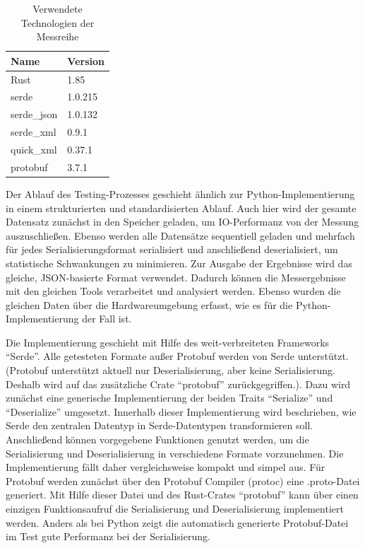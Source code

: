 \documentclass[ngerman]{seminarvorlage}
\begin{document}
\begin{table}[H]
    \centering
    \begin{tabular}{|l|l|}
    \hline
    \textbf{Name} & \textbf{Version} \\ \hline
    Rust          & 1.85             \\ \hline
    serde         & 1.0.215          \\ \hline
    serde\_json   & 1.0.132          \\ \hline
    serde\_xml    & 0.9.1            \\ \hline
    quick\_xml    & 0.37.1           \\ \hline
    protobuf      & 3.7.1            \\ \hline
    \end{tabular}
    \caption{Verwendete Technologien der Messreihe}
\end{table}

Der Ablauf des Testing-Prozesses geschieht ähnlich zur Python-Implementierung in einem strukturierten und standardisierten Ablauf. Auch hier wird der gesamte Datensatz zunächst in den Speicher geladen, um IO-Performanz von der Messung auszuschließen. Ebenso werden alle Datensätze sequentiell geladen und mehrfach für jedes Serialisierungsformat serialisiert und anschließend deserialisiert, um statistische Schwankungen zu minimieren. Zur Ausgabe der Ergebnisse wird das gleiche, JSON-basierte Format verwendet. Dadurch können die Messergebnisse mit den gleichen Tools verarbeitet und analysiert werden. Ebenso wurden die gleichen Daten über die Hardwareumgebung erfasst, wie es für die Python-Implementierung der Fall ist.

Die Implementierung geschieht mit Hilfe des weit-verbreiteten \cite{serde} Frameworks ``Serde''. Alle getesteten Formate außer Protobuf werden von Serde unterstützt. (Protobuf unterstützt aktuell nur Deserialisierung, aber keine Serialisierung. Deshalb wird auf das zusätzliche Crate ``protobuf'' zurückgegriffen.). Dazu wird zunächst eine generische Implementierung der beiden Traits ``Serialize'' und ``Deserialize'' umgesetzt. Innerhalb dieser Implementierung wird beschrieben, wie Serde den zentralen Datentyp in Serde-Datentypen transformieren soll. Anschließend können vorgegebene Funktionen genutzt werden, um die Serialisierung und Deserialisierung in verschiedene Formate vorzunehmen. Die Implementierung fällt daher vergleichsweise kompakt und simpel aus. Für Protobuf werden zunächst über den Protobuf Compiler (protoc) eine .proto-Datei generiert. Mit Hilfe dieser Datei und des Rust-Crates ``protobuf'' kann über einen einzigen Funktionsaufruf die Serialisierung und Deserialisierung implementiert werden. Anders als bei Python zeigt die automatisch generierte Protobuf-Datei im Test gute Performanz bei der Serialisierung.
\end{document}
